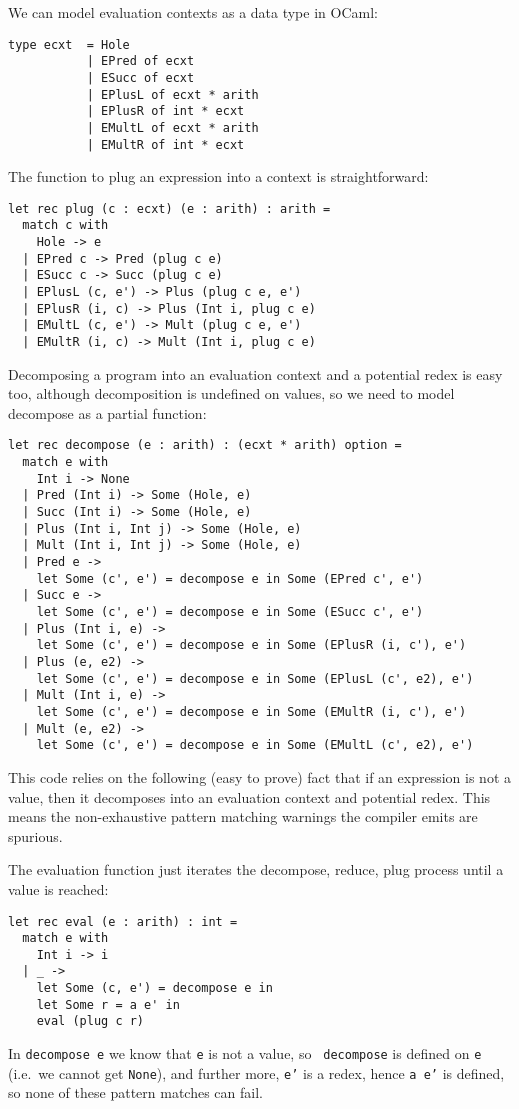 We can model evaluation contexts as a data type in OCaml:
\begin{verbatim}
type ecxt  = Hole
           | EPred of ecxt
           | ESucc of ecxt
           | EPlusL of ecxt * arith
           | EPlusR of int * ecxt
           | EMultL of ecxt * arith
           | EMultR of int * ecxt
\end{verbatim}
The function to plug an expression into a context is straightforward:
\begin{verbatim}
let rec plug (c : ecxt) (e : arith) : arith =
  match c with
    Hole -> e
  | EPred c -> Pred (plug c e)
  | ESucc c -> Succ (plug c e)
  | EPlusL (c, e') -> Plus (plug c e, e')
  | EPlusR (i, c) -> Plus (Int i, plug c e)
  | EMultL (c, e') -> Mult (plug c e, e')
  | EMultR (i, c) -> Mult (Int i, plug c e)
\end{verbatim}
Decomposing a program into an evaluation context and a potential redex
is easy too, although decomposition is undefined on values, so we
need to model decompose as a partial function:
\begin{verbatim}
let rec decompose (e : arith) : (ecxt * arith) option =
  match e with
    Int i -> None
  | Pred (Int i) -> Some (Hole, e)
  | Succ (Int i) -> Some (Hole, e)
  | Plus (Int i, Int j) -> Some (Hole, e)
  | Mult (Int i, Int j) -> Some (Hole, e)
  | Pred e ->
    let Some (c', e') = decompose e in Some (EPred c', e')
  | Succ e ->
    let Some (c', e') = decompose e in Some (ESucc c', e')
  | Plus (Int i, e) ->
    let Some (c', e') = decompose e in Some (EPlusR (i, c'), e')
  | Plus (e, e2) ->
    let Some (c', e') = decompose e in Some (EPlusL (c', e2), e')
  | Mult (Int i, e) ->
    let Some (c', e') = decompose e in Some (EMultR (i, c'), e')
  | Mult (e, e2) ->
    let Some (c', e') = decompose e in Some (EMultL (c', e2), e')
\end{verbatim}
This code relies on the following (easy to prove) fact that if an
expression is not a value, then it decomposes into an evaluation
context and potential redex.  This means the non-exhaustive pattern
matching warnings the compiler emits are spurious.

The evaluation function just iterates the decompose, reduce, plug
process until a value is reached:
\begin{verbatim}
let rec eval (e : arith) : int =
  match e with
    Int i -> i
  | _ ->
    let Some (c, e') = decompose e in
    let Some r = a e' in
    eval (plug c r)
\end{verbatim}
In {\tt decompose e} we know that {\tt e} is not a value, so {\tt
  decompose} is defined on {\tt e} (i.e.~we cannot get {\tt None}),
and further more, {\tt e'} is a redex, hence {\tt a e'} is
defined, so none of these pattern matches can fail.

